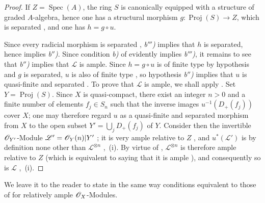 \begin{proof}
If $Z=\operatorname{Spec}(A)$, the ring $S$ is canonically equipped with a structure of graded $A$-algebra, hence one has a structural morphism $g:\operatorname{Proj}(S)\to Z$, which is separated , and one has $h=g\circ u$.

Since every radicial morphism is separated , \emph{b$'''$)} implies that $h$ is separated, hence implies \emph{b$''$)}.
Since condition \emph{b)} of  evidently implies \emph{b$'''$)}, it remains to see that \emph{b$''$)} implies that $\mathscr{L}$ is ample.
Since $h=g\circ u$ is of finite type by hypothesis and $g$ is separated, $u$ is also of finite type , so hypothesis \emph{b$''$)} implies that $u$ is quasi-finite and separated .
To prove that $\mathscr{L}$ is ample, we shall apply .
Set $Y=\operatorname{Proj}(S)$.
Since $X$ is quasi-compact, there exist an integer $n>0$ and a finite number of elements $f_j\in S_n$ such that the inverse images $u^{-1}(D_+(f_j))$ cover $X$; one may therefore regard $u$ as a quasi-finite and separated morphism from $X$ to the open subset $Y'=\bigcup_j D_+(f_j)$ of $Y$.
Consider then the invertible $\mathscr{O}_{Y'}$-Module $\mathscr{L}'=\mathscr{O}_Y(n)|Y'$ ; it is very ample relative to $Z$ , and $u^*(\mathscr{L}')$ is by definition none other than $\mathscr{L}^{\otimes n}$
,~(i).
By virtue of , $\mathscr{L}^{\otimes n}$ is therefore ample relative to $Z$ (which is equivalent to saying that it is ample ), and consequently so is $\mathscr{L}$ ,~(i).
\end{proof}

We leave it to the reader to state in the same way conditions equivalent to those of  for relatively ample $\mathscr{O}_X$-Modules.
